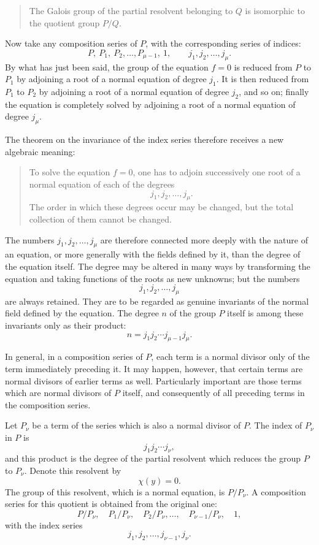 \documentclass[12pt,a4paper]{article}
\begin{document}
\begin{quote}
The Galois group of the partial resolvent belonging to \(Q\) is isomorphic to the quotient group \(P/Q\).
\end{quote}

Now take any composition series of \(P\), with the corresponding series of indices:
\[
 P,\ P_1,\ P_2,\ldots,P_{\mu-1},\ 1,
 \qquad
 j_1,j_2,\ldots,j_\mu .
\]
By what has just been said, the group of the equation \(f=0\) is reduced from \(P\) to \(P_1\) by adjoining a root of a normal equation of degree \(j_1\).  It is then reduced from \(P_1\) to \(P_2\) by adjoining a root of a normal equation of degree \(j_2\), and so on; finally the equation is completely solved by adjoining a root of a normal equation of degree \(j_\mu\).

The theorem on the invariance of the index series therefore receives a new algebraic meaning:

\begin{quote}
To solve the equation \(f=0\), one has to adjoin successively one root of a normal equation of each of the degrees
\[
 j_1,j_2,\ldots,j_\mu .
\]
The order in which these degrees occur may be changed, but the total collection of them cannot be changed.
\end{quote}

The numbers \(j_1,j_2,\ldots,j_\mu\) are therefore connected more deeply with the nature of an equation, or more generally with the fields defined by it, than the degree of the equation itself.  The degree may be altered in many ways by transforming the equation and taking functions of the roots as new unknowns; but the numbers
\[
 j_1,j_2,\ldots,j_\mu
\]
are always retained.  They are to be regarded as genuine invariants of the normal field defined by the equation.  The degree \(n\) of the group \(P\) itself is among these invariants only as their product:
\[
 n=j_1j_2\cdots j_{\mu-1}j_\mu .
\]

In general, in a composition series of \(P\), each term is a normal divisor only of the term immediately preceding it.  It may happen, however, that certain terms are normal divisors of earlier terms as well.  Particularly important are those terms which are normal divisors of \(P\) itself, and consequently of all preceding terms in the composition series.

Let \(P_\nu\) be a term of the series which is also a normal divisor of \(P\).  The index of \(P_\nu\) in \(P\) is
\[
 j_1j_2\cdots j_\nu,
\]
and this product is the degree of the partial resolvent which reduces the group \(P\) to \(P_\nu\).  Denote this resolvent by
\[
 \chi(y)=0.
\]
The group of this resolvent, which is a normal equation, is \(P/P_\nu\).  A composition series for this quotient is obtained from the original one:
\[
 P/P_\nu,\quad P_1/P_\nu,\quad P_2/P_\nu,\ldots,\quad
 P_{\nu-1}/P_\nu,\quad 1,
\]
with the index series
\[
 j_1,j_2,\ldots,j_{\nu-1},j_\nu .
\]
\end{document}
